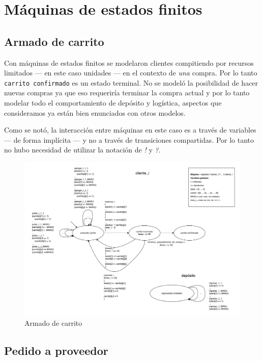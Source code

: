 \section{Máquinas de estados finitos}

\subsection{Armado de carrito}
Con máquinas de estados finitos se modelaron clientes compitiendo por recursos
limitados --- en este caso unidades --- en el contexto de \textit{una} compra.
Por lo tanto \texttt{carrito confirmado} es un estado terminal.
No se modeló la posibilidad de hacer nuevas compras ya que eso requeriría
terminar la compra actual y por lo tanto modelar todo el comportamiento de
depósito y logística, aspectos que consideramos ya están bien enunciados con
otros modelos.

Como se notó, la interacción entre máquinas en este caso es a través de
variables --- de forma implícita --- y no a través de transiciones compartidas.
Por lo tanto no hubo necesidad de utilizar la notación de \textit{!} y
\textit{?}.

\begin{figure}[H]
  \begin{center}
  \includegraphics[angle=90,height=.9\textheight]{tp2/images/fsm.pdf}
  \end{center}
  \caption{Armado de carrito}
  \label{fsm:compra}
\end{figure}

\subsection{Pedido a proveedor}

